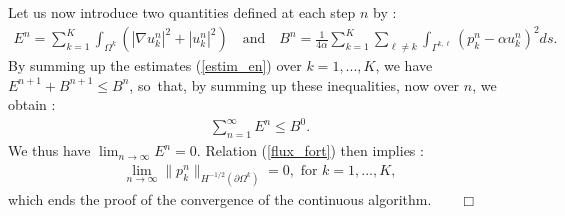 \documentclass[final]{siamltex}
\begin{document}
Let us now introduce two quantities defined at each step $n$ by :
\begin{eqnarray}
E^n=\sum_{k=1}^K \int_{\Omega^k} \left( |\nabla u_k^{n}|^2
+|u_k^{n}|^2 \right)
\quad
\text{and}
\quad
B^n = \frac{1}{4\alpha}\sum_{k=1}^K\sum_{\ell \ne k} \int_{\Gamma^{k,\ell}}
( p_k^{n}-\alpha u_k^{n})^2ds. \nonumber
\end{eqnarray}
By summing up the estimates (\ref{estim_en}) over $k=1,...,K$, we have
$E^{n+1} + B^{n+1} \le B^n$,
so~that, by summing up these inequalities, now over $n$, we obtain :
\begin{eqnarray}
\sum_{n=1}^{\infty} E^{n} \le B^0. \nonumber
\end{eqnarray}
We thus have $\lim_{n \longrightarrow \infty} E^n =0$.
Relation (\ref{flux_fort}) then implies :
\begin{eqnarray}
\lim_{n \longrightarrow \infty} \|p_k^n\|_{H^{-1/2}(\partial\Omega^k)}=0,
\mbox{  for } k=1,...,K, \nonumber
\end{eqnarray}
which ends the proof of the convergence of the continuous algorithm.$\qquad \Box$
\end{document}

